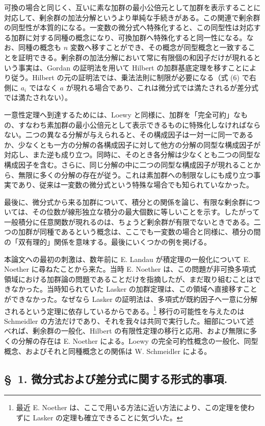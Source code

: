 \documentclass[11pt]{article}
\begin{document}
可換の場合と同じく、互いに素な加群の最小公倍元として加群を表示することに対応して、剰余群の加法分解というより単純な手続きがある。この関連で剰余群の同型性が本質的になる。一変数の微分式へ特殊化すると、この同型性は対応する加群に対する同種の概念になり、可換加群へ特殊化すると同一性になる。なお、同種の概念も $n$ 変数へ移すことができ、その概念が同型概念と一致することを証明できる。剰余群の加法分解において常に有限個の和因子だけが現れるという事実は、Gordan の証明法を用いて Hilbert の加群基底定理を移すことにより従う。Hilbert の元の証明法では、乗法法則に制限が必要になる（式 (6) で右側に $a_i$ ではなく $a$ が現れる場合であり、これは微分式では満たされるが差分式では満たされない）。

一意性定理へ到達するためには、Loewy と同様に、加群を「完全可約」なもの、すなわち素加群の最小公倍元として表示できるものに特殊化しなければならない。二つの異なる分解が与えられると、その構成因子は一対一に同一であるか、少なくとも一方の分解の各構成因子に対して他方の分解の同型な構成因子が対応し、また逆も成り立つ。同時に、そのとき各分解は少なくとも二つの同型な構成因子を含む。さらに、同じ分解の中に二つの同型な構成因子が現れることから、無限に多くの分解の存在が従う。これは素加群への制限なしにも成り立つ事実であり、従来は一変数の微分式という特殊な場合でも知られていなかった。

最後に、微分式から来る加群について、積分との関係を論じ、有限な剰余群については、その位数が線形独立な積分の最大個数に等しいことを示す。したがって一般積分に任意関数が現れるのは、ちょうど剰余群が有限でないときである。二つの加群が同種であるという概念は、ここでも一変数の場合と同様に、積分の間の「双有理的」関係を意味する。最後にいくつかの例を掲げる。

本論文への最初の刺激は、数年前に E. Landau が積定理の一般化について E. Noether に尋ねたことから来た。当時 E. Noether は、この問題が非可換多項式領域における加群論の問題であることだけを指摘したが、まだ取り組むことはできなかった。当時知られていた Lasker の加群定理は、この領域へ直接移すことができなかった。なぜなら Lasker の証明法は、多項式が既約因子へ一意に分解されるという定理に依存しているからである。\footnote{最近 E. Noether は、ここで用いる方法に近い方法により、この定理を使わずに Lasker の定理も確立できることに気づいた。} 移行の可能性を与えたのは Schmeidler の方法だけであり、それを我々は共同で実行した。細部について述べれば、剰余群の一般化、Hilbert の有限性定理の移行と応用、および無限に多くの分解の存在は E. Noether による。Loewy の完全可約性概念の一般化、同型概念、およびそれと同種概念との関係は W. Schmeidler による。

\subsection*{\S~1. 微分式および差分式に関する形式的事項.}
\end{document}
